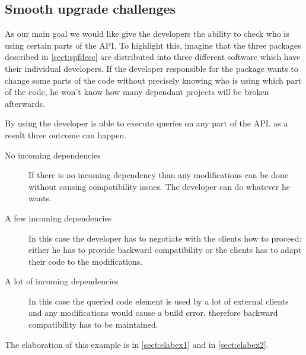 \subsection{Smooth upgrade challenges}
As our main goal we would like give the developers the ability to check who is
using certain parts of the API. To highlight this, imagine that the three
packages described in \autoref{sect:spfdesc} are distributed into three
different software which have their individual developers. If the developer
responsible for the  package wants to change some parts of the
code without precisely knowing who is using which part of the code, he won't
know how many dependant projects will be broken afterwards. 

By using \ptool{} the developer is able to execute queries on any part of the
API. as a result three outcome can happen.
\begin{description}
  \item[No incoming dependencies] If there is no incoming dependency than any modifications can be done without
causing compatibility issues. The developer can do whatever he wants.
  \item[A few incoming dependencies] In this case the developer has to negotiate
with the clients how to proceed: either he has to provide backward compatibility or the
clients has to adapt their code to the modifications.
  \item[A lot of incoming dependencies] In this case the queried code
element is used by a lot of external clients and any modifications would cause a build
error, therefore backward compatibility has to be maintained.
\end{description}
The elaboration of this example is in \autoref{sect:elabex1} and in \autoref{sect:elabex2}.